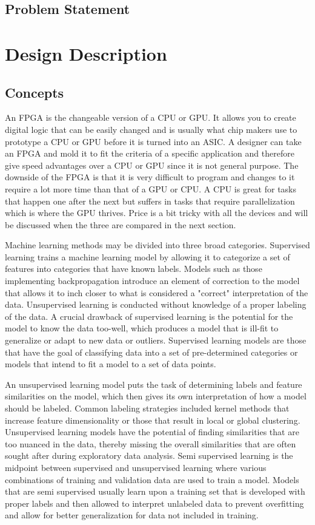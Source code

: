 \documentclass[12pt,titlepage]{article}
\begin{document}
\subsection{Problem Statement}


\section{Design Description}
\subsection{Concepts}
An FPGA is the changeable version of a CPU or GPU. It allows you to create digital logic that can be easily changed and is usually what chip makers
use to prototype a CPU or GPU before it is turned into an ASIC. A designer can take an FPGA and mold it to fit the criteria of a specific application
and therefore give speed advantages over a CPU or GPU since it is not general purpose. The downside of the FPGA is that it is very difficult to program
and changes to it require a lot more time than that of a GPU or CPU. A CPU is great for tasks that happen one after the next but suffers in tasks that
require parallelization which is where the GPU thrives. Price is a bit tricky with all the devices and will be discussed when the three are compared in
the next section.

Machine learning methods may be divided into three broad categories. Supervised learning trains a machine learning model by allowing it to categorize
a set of features into categories that have known labels. Models such as those implementing backpropagation introduce an element of correction to the
model that allows it to inch closer to what is considered a "correct" interpretation of the data. Unsupervised learning is conducted without knowledge
of a proper labeling of the data. A crucial drawback of supervised learning is the potential for the model to know the data too-well, which produces a
model that is ill-fit to generalize or adapt to new data or outliers. Supervised learning models are those that have the goal of classifying data into
a set of pre-determined categories or models that intend to fit a model to a set of data points. 

An unsupervised learning model puts the task of determining labels and feature similarities on the model, which then gives its own interpretation of how
a model should be labeled. Common labeling strategies included kernel methods that increase feature dimensionality or those that result in local or
global clustering. Unsupervised learning models have the potential of finding similarities that are too nuanced in the data, thereby missing the overall
similarities that are often sought after during exploratory data analysis.  Semi supervised learning is the midpoint between supervised and unsupervised
learning where various combinations of training and validation data are used to train a model. Models that are semi supervised usually learn upon a
training set that is developed with proper labels and then allowed to interpret unlabeled data to prevent overfitting and allow for better generalization
for data not included in training. 
\end{document}
